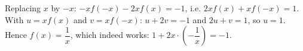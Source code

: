 Replacing $x$ by $-x$: $-xf(-x)-2xf(x)=-1$, i.e. $2xf(x)+xf(-x)=1$. With $u=xf(x)$ and $v=xf(-x)$: $u+2v=-1$ and $2u+v=1$, so $u=1$. Hence $f(x)=\boxed{\dfrac1x}$, which indeed works: $1+2x\cdot\left(-\dfrac1x\right)=-1$.

